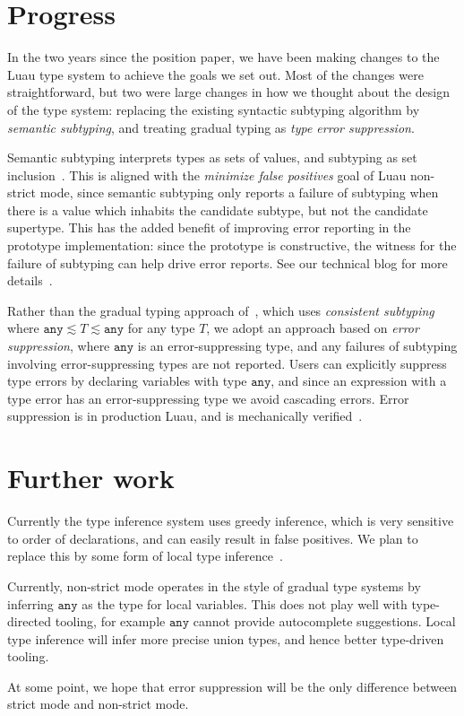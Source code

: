 \documentclass[acmsmall]{acmart}
\newcommand{\ANY}{\mathtt{any}}
\begin{document}
\section{Progress}

In the two years since the position paper, we have been making changes
to the Luau type system to achieve the goals we set out. Most of the
changes were straightforward, but two were large changes in how we
thought about the design of the type system: replacing the existing
syntactic subtyping algorithm by \emph{semantic subtyping}, and
treating gradual typing as \emph{type error suppression}.

Semantic subtyping
interprets types as sets of values, and subtyping as set
inclusion~\cite{GF05:GentleIntroduction}. This is aligned with the
\emph{minimize false positives} goal of Luau non-strict mode, since
semantic subtyping only reports a failure of subtyping when there is a
value which inhabits the candidate subtype, but not the candidate
supertype. This has the added benefit of improving error reporting in
the prototype implementation: since the prototype is constructive, the
witness for the failure of subtyping can help drive error reports.
See our technical blog for more details~\cite{Jef22:SemanticSubtyping}.

Rather than the gradual typing approach
of~\cite{ST07:GradualTyping}, which uses \emph{consistent
subtyping} where $\ANY \lesssim T \lesssim \ANY$ for any type $T$, we
adopt an approach based on \emph{error suppression}, where $\ANY$ is
an error-suppressing type, and any failures of subtyping involving
error-suppressing types are not reported. Users can explicitly
suppress type errors by declaring variables with type $\ANY$, and
since an expression with a type error has an error-suppressing type we
avoid cascading errors. Error suppression is in production Luau, and is
mechanically verified~\cite{BJ23:agda-typeck}.

\section{Further work}

Currently the type inference system uses greedy inference, which is
very sensitive to order of declarations, and can easily result in
false positives. We plan to replace this by some form of local type
inference~\cite{PT00:LocalTypeInference}.

Currently, non-strict mode operates in the style of gradual type
systems by inferring $\ANY$ as the type for local variables. This does
not play well with type-directed tooling, for example $\ANY$ cannot
provide autocomplete suggestions. Local type inference will infer more
precise union types, and hence better type-driven tooling.

At some point, we hope that error suppression will be the only difference
between strict mode and non-strict mode.

 
\end{document}
